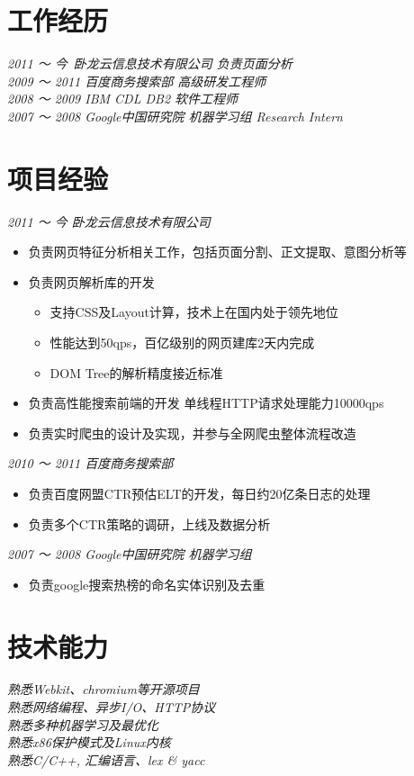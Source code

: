\documentclass[margin, 10pt]{res} %
\begin{document}
\begin{resume}
\section{工作经历}
{\sl 2011 ～  今\  卧龙云信息技术有限公司 负责页面分析}   \\
{\sl 2009 ～ 2011 百度商务搜索部 高级研发工程师}  \\
{\sl 2008 ～ 2009 IBM CDL  DB2 软件工程师} \\
{\sl 2007 ～ 2008 Google中国研究院 机器学习组 Research Intern} \\

\section{项目经验}
        {\sl 2011 ～ 今 卧龙云信息技术有限公司}   \\
\begin{itemize} \itemsep -2pt %
\item 负责网页特征分析相关工作，包括页面分割、正文提取、意图分析等
\item 负责网页解析库的开发
  \begin{itemize}
    \item 支持CSS及Layout计算，技术上在国内处于领先地位
    \item 性能达到50qps，百亿级别的网页建库2天内完成
    \item DOM Tree的解析精度接近标准
  \end{itemize}
\item 负责高性能搜索前端的开发 单线程HTTP请求处理能力10000qps
\item 负责实时爬虫的设计及实现，并参与全网爬虫整体流程改造
\end{itemize}
 
{\sl 2010 ～ 2011 百度商务搜索部}  \\
\begin{itemize} 
\item 负责百度网盟CTR预估ELT的开发，每日约20亿条日志的处理
\item 负责多个CTR策略的调研，上线及数据分析
\end{itemize} 

{\sl 2007 ～ 2008 Google中国研究院  机器学习组} \\
\begin{itemize}
  \item 负责google搜索热榜的命名实体识别及去重
\end{itemize}


\section{技术能力} 
{\sl 熟悉Webkit、chromium等开源项目} \\
{\sl 熟悉网络编程、异步I/O、HTTP协议} \\
{\sl 熟悉多种机器学习及最优化} \\
{\sl 熟悉x86保护模式及Linux内核} \\
{\sl 熟悉C/C++, 汇编语言、lex \& yacc} \\

\end{resume}
\end{document}
